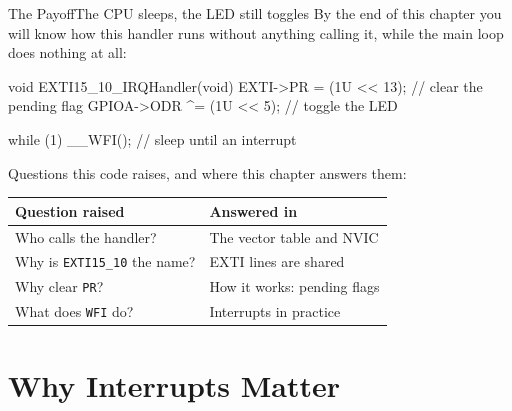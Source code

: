 \documentclass[9pt,aspectratio=169,xcolor=table]{beamer}
\begin{document}
{\beamerextras
\begin{frame}[fragile]{The Payoff}{The CPU sleeps, the LED still toggles}
    \leavevmode
    By the end of this chapter you will know how this handler runs without anything calling it, while the main loop does nothing at all:

    \vspace{2mm}
    \begin{center}
    \begin{minipage}{.9\textwidth}
\begin{cc}[basicstyle=\ttfamily\small]
void EXTI15_10_IRQHandler(void) {
    EXTI->PR = (1U << 13);       // clear the pending flag
    GPIOA->ODR ^= (1U << 5);     // toggle the LED
}

while (1) { __WFI(); }          // sleep until an interrupt
\end{cc}
    \end{minipage}
    \end{center}

    \vspace{2mm}
    {\small Questions this code raises, and where this chapter answers them:}

    \vspace{1mm}
    \begin{center}
    {\small
    \striped
    \begin{tabular}{@{}l R{.52\textwidth}@{}}
        \toprule
        \textbf{Question raised} & \textbf{Answered in} \\
        \midrule
        Who calls the handler? & The vector table and NVIC \\
        Why is \texttt{EXTI15\_10} the name? & EXTI lines are shared \\
        Why clear \texttt{PR}? & How it works: pending flags \\
        What does \texttt{WFI} do? & Interrupts in practice \\
        \bottomrule
    \end{tabular}}
    \end{center}
\end{frame}
}


\section{Why Interrupts Matter}
\end{document}
